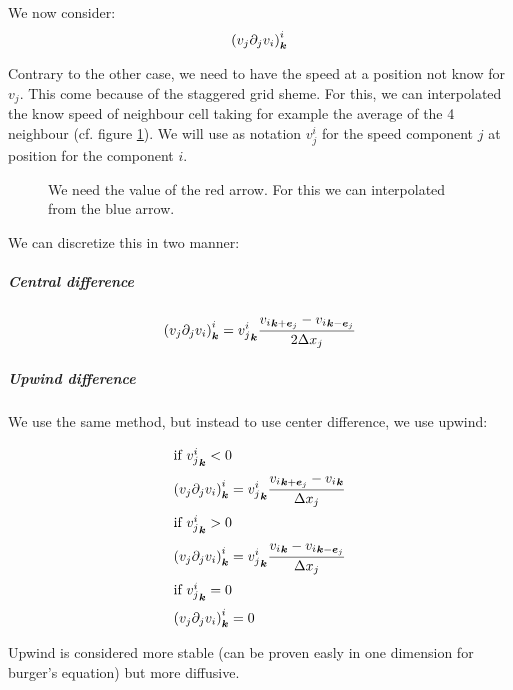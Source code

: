 We now consider:
\begin{equation}
\left(v_{j}\partial_{j}v_{i}\right)^{i}_{{\boldsymbol {k}}}
\end{equation}

\begin{remark}
  Contrary to the other case, we need to have the speed at a position not know for $v_{j}$. This come because of the staggered grid sheme.
  For this, we can interpolated the know speed of neighbour cell taking for example the average of the 4 neighbour (cf. figure \ref{fixed:staggered_convection_upwind}).
  We will use as notation $v_{j}^{i}$ for the speed component $j$ at position for the component $i$.
  
  \begin{figure}
    \caption{We need the value of the red arrow. For this we can interpolated from the blue arrow.}
    \label{fixed:staggered_convection_upwind}
    \end{figure}
\end{remark}

We can discretize this in two manner:

\subparagraph{Central difference}
\begin{equation}
\left(v_{j}\partial_{j}v_{i}\right)^{i}_{{\boldsymbol {k}}}={v_{j}^{i}}_{{\boldsymbol {k}}}\frac{{v_{i}}_{{\boldsymbol {k}}+{\boldsymbol {e}}_j}-{v_{i}}_{{\boldsymbol {k}}-{\boldsymbol {e}}_j}}{2\Delta x_{j}}
\end{equation}

\subparagraph{Upwind difference}

We use the same method, but instead to use center difference, we use upwind:

\begin{align}
\intertext{if ${v_{j}^{i}}_{{\boldsymbol {k}}}<0$}
\left(v_{j}\partial_{j}v_{i}\right)^{i}_{{\boldsymbol {k}}}&={v_{j}^{i}}_{{\boldsymbol {k}}}\frac{{v_{i}}_{{\boldsymbol {k}}+{\boldsymbol {e}}_j}-{v_{i}}_{{\boldsymbol {k}}}}{\Delta x_{j}}\\
\intertext{if ${v_{j}^{i}}_{{\boldsymbol {k}}}>0$}
\left(v_{j}\partial_{j}v_{i}\right)^{i}_{{\boldsymbol {k}}}&={v_{j}^{i}}_{{\boldsymbol {k}}}\frac{{v_{i}}_{{\boldsymbol {k}}}-{v_{i}}_{{\boldsymbol {k}}-{\boldsymbol {e}}_j}}{\Delta x_{j}}\\
\intertext{if ${v_{j}^{i}}_{{\boldsymbol {k}}}=0$}
\left(v_{j}\partial_{j}v_{i}\right)^{i}_{{\boldsymbol {k}}}&=0
\end{align}

Upwind is considered more stable (can be proven easly in one dimension for burger's equation) but more diffusive.


